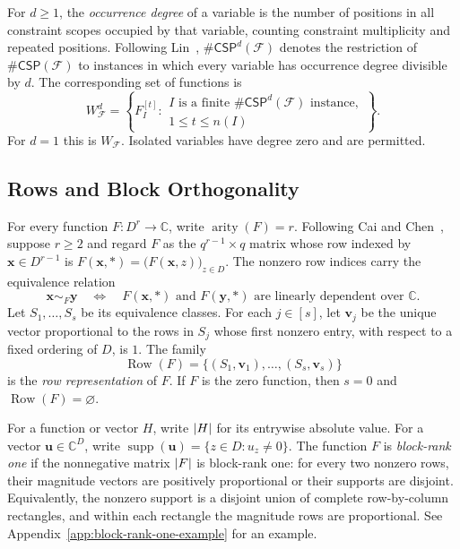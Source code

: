 \documentclass[11pt,letterpaper,onecolumn]{article}
\theoremstyle{plain}
\theoremstyle{definition}
\theoremstyle{remark}
\newcommand{\AlgNums}{\mathbb C}
\newcommand{\cF}{\mathcal F}
\newcommand{\CSP}[1]{\mathsf{\#CSP}(#1)}
\newcommand{\CSPdeg}[2]{\mathsf{\#CSP}^{#1}(#2)}
\newcommand{\WFdeg}[1]{W_{\cF}^{#1}}
\DeclareMathOperator{\arity}{arity}
\DeclareMathOperator{\supp}{supp}
\DeclareMathOperator{\Row}{Row}
\DeclarePairedDelimiter{\abs}{\lvert}{\rvert}
\begin{document}
For $d\ge1$, the \emph{occurrence degree} of a variable is the number
of positions in all constraint scopes occupied by that variable, counting
constraint multiplicity and repeated positions.  Following
Lin~\cite{Lin2021}, $\CSPdeg{d}{\cF}$ denotes the restriction of
$\CSP{\cF}$ to instances in which every variable has occurrence degree
divisible by $d$.  The corresponding set of functions is
\begin{equation*}
  \WFdeg{d}
  =\left\{F_I^{[t]}:
    \begin{array}{l}
      I\text{ is a finite }\CSPdeg{d}{\cF}\text{ instance},\\
      1\le t\le n(I)
    \end{array}
    \right\}.
\end{equation*}
For $d=1$ this is $W_{\cF}$.  Isolated variables have degree zero and
are permitted.

\subsection{Rows and Block Orthogonality}

For every function $F:D^r\to\AlgNums$, write $\arity(F)=r$.  Following Cai and
Chen~\cite[Sections~2.3 and~2.5]{CaiChen2017}, suppose $r\ge2$ and regard
$F$ as the
$q^{r-1}\times q$ matrix whose row indexed by
$\mathbf x\in D^{r-1}$ is $F(\mathbf x,\ast)=\bigl(F(\mathbf x,z)\bigr)_{z\in D}$. The nonzero row indices carry the equivalence relation
\begin{equation}
  \mathbf x\sim_F\mathbf y
  \quad\Longleftrightarrow\quad
  F(\mathbf x,\ast)\text{ and }F(\mathbf y,\ast)
  \text{ are linearly dependent over }\mathbb C.
  \label{eq:complex-row-equivalence}
\end{equation}
Let $S_1,\ldots,S_s$ be its equivalence classes.  For each $j\in[s]$,
let $\mathbf v_j$ be the unique vector proportional to the rows in $S_j$
whose first nonzero entry, with respect to a fixed ordering of $D$, is $1$.
The family
\begin{equation*}
  \Row(F)=\{(S_1,\mathbf v_1),\ldots,(S_s,\mathbf v_s)\}
\end{equation*}
is the \emph{row representation} of $F$.  If $F$ is the zero function,
then $s=0$ and $\Row(F)=\varnothing$.

For a function or vector $H$, write $\abs H$ for its entrywise absolute value.
For a vector $\mathbf u\in\mathbb C^D$, write
$\supp(\mathbf u)=\{z\in D:u_z\ne0\}$.
The function $F$ is \emph{block-rank one} if the
nonnegative matrix $\abs F$ is block-rank one: for every two nonzero rows,
their magnitude vectors are positively proportional or their supports are
disjoint.  Equivalently, the nonzero support is a disjoint union of complete
row-by-column rectangles, and within each rectangle the magnitude rows are
proportional.  See Appendix~\ref{app:block-rank-one-example} for an example.
\end{document}
